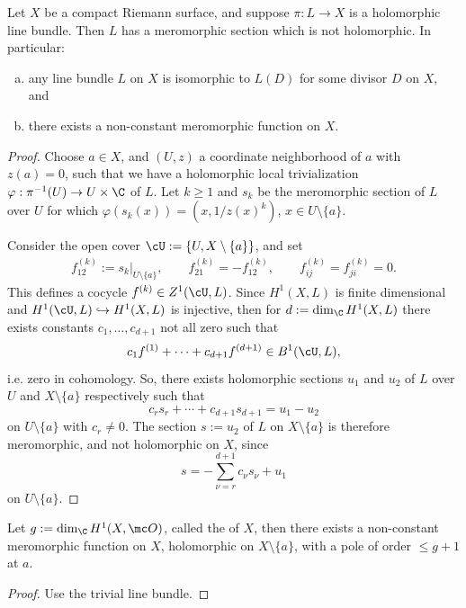 \documentclass[11pt]{report}
\begin{document}
\begin{thm}[][label=thm:exists-meromorphic]
Let $X$ be a compact Riemann surface, and suppose $\pi:L \to X$ is a holomorphic line bundle. Then $L$ has a meromorphic section which is not holomorphic. In particular:
\begin{enumerate}[(a)]
    \item any line bundle $L$ on $X$ is isomorphic to $L(D)$ for some divisor $D$ on $X$, and
    \item there exists a non-constant meromorphic function on $X$.
\end{enumerate}
\end{thm}

\begin{proof}
Choose $a \in X$, and $(U,z)$ a coordinate neighborhood of $a$ with $z(a)=0$, such that we have a holomorphic local trivialization $\varphi:\pi^{-1}(U) \to U \times \C$ of $L$. Let $k \geq 1$ and $s_k$ be the meromorphic section of $L$ over $U$ for which $\varphi(s_k(x))= (x,1/z(x)^k)$, $x \in U \setminus \{a\}$. 

Consider the open cover $\cU := \{U, X\setminus \{a\}\}$, and set
\begin{align*}
    f_{12}^{(k)}:= s_k|_{U \setminus \{a\}}, \qquad f_{21}^{(k)}=-f_{12}^{(k)}, \qquad f_{ij}^{(k)}=f_{ji}^{(k)}=0.
\end{align*}
This defines a cocycle $f^{(k)} \in Z^1(\cU,L)$. Since $H^1(X,L)$ is finite dimensional and $H^1(\cU,L)\hookrightarrow H^1(X,L)$ is injective, then for $d:= \dim_\C H^1(X,L)$ there exists constants $c_1,\dots,c_{d+1}$ not all zero such that 
\[
c_1f^{(1)}+\cdots +c_{d+1}f^{(d+1)}\in B^1(\cU,L),
\]
i.e. zero in cohomology. So, there exists holomorphic sections $u_1$ and $u_2$ of $L$ over $U$ and $X\setminus \{a\}$ respectively such that
\[
c_rs_r+\cdots + c_{d+1}s_{d+1}=u_1 -u_2
\]
on $U \setminus \{a\}$ with $c_r \neq 0$. The section $s:= u_2$ of $L$ on $X \setminus \{a\}$ is therefore meromorphic, and not holomorphic on $X$, since 
\[
s = -\sum_{\nu=r}^{d+1}c_\nu s_\nu + u_1
\]
on $U \setminus \{a\}$.
\end{proof}

\begin{cor}[][label=cor:pole-less-genus]
Let $g:=\dim_\C H^1(X,\mc O)$, called the  of $X$, then there exists a non-constant meromorphic function on $X$, holomorphic on $X \setminus \{a\}$, with a pole of order $\leq g+1$ at $a$.
\end{cor}
\begin{proof}
    Use the trivial line bundle.
\end{proof}
\end{document}
